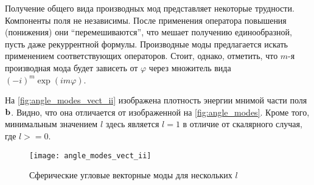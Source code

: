 \documentclass[12pt,a4paper]{article}
\begin{document}
        Получение общего вида производных мод представляет некоторые трудности. Компоненты поля не независимы. После применения оператора повышения (понижения) они \enquote{перемешиваются}, что мешает получению единообразной, пусть даже рекуррентной формулы. Производные моды предлагается искать применением соответствующих операторов. Стоит, однако, отметить, что $m$-я производная мода будет зависеть от $\varphi$ через множитель вида $(-i)^m \exp(i m \varphi)$.

        На \autoref{fig:angle_modes_vect_ii} изображена плотность энергии мнимой части поля $\vb{b}$. Видно, что она отличается от изображенной на \autoref{fig:angle_modes}. Кроме того, минимальным значением $l$ здесь является $l = 1$ в отличие от скалярного случая, где $l >= 0$.
        \begin{figure}[h]
            \centering
            \texttt{[image: angle\_modes\_vect\_ii]}
            \caption[]{Сферические угловые векторные моды для нескольких $l$}
            \label{fig:angle_modes_vect_ii}
        \end{figure}


    \nocite{*}
    
    
\end{document}
